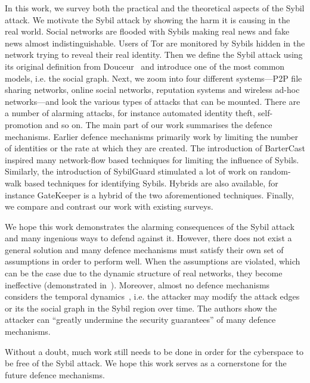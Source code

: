 In this work, we survey both the practical and the theoretical aspects of the
Sybil attack. We motivate the Sybil attack by showing the harm it is causing in
the real world. Social networks are flooded with Sybils making real news and
fake news almost indistinguishable. Users of Tor are monitored by Sybils hidden
in the network trying to reveal their real identity. Then we define the Sybil
attack using its original definition from Douceur~\cite{douceur2002sybil} and
introduce one of the most common models, i.e. the social graph. Next, we zoom
into four different systems---P2P file sharing networks, online social networks,
reputation systems and wireless ad-hoc networks---and look the various types of
attacks that can be mounted. There are a number of alarming attacks, for
instance automated identity theft, self-promotion and so on. The main part of
our work summarises the defence mechanisms. Earlier defence mechanisms primarily
work by limiting the number of identities or the rate at which they are created.
The introduction of BarterCast inspired many network-flow based techniques for
limiting the influence of Sybils. Similarly, the introduction of SybilGuard
stimulated a lot of work on random-walk based techniques for identifying Sybils.
Hybrids are also available, for instance GateKeeper is a hybrid of the two
aforementioned techniques. Finally, we compare and contrast our work with
existing surveys.

We hope this work demonstrates the alarming consequences of the Sybil attack and
many ingenious ways to defend against it. However, there does not exist a
general solution and many defence mechanisms must satisfy their own set of
assumptions in order to perform well. When the assumptions are violated, which
can be the case due to the dynamic structure of real networks, they become
ineffective (demonstrated in~\cite{liu2016smartwalk}). Moreover, almost no
defence mechanisms considers the temporal dynamics~\cite{liu2015exploiting},
i.e. the attacker may modify the attack edges or its the social graph in the
Sybil region over time. The authors show the attacker can ``greatly undermine
the security guarantees'' of many defence mechanisms.

Without a doubt, much work still needs to be done in order for the cyberspace to
be free of the Sybil attack. We hope this work serves as a cornerstone for the
future defence mechanisms.


